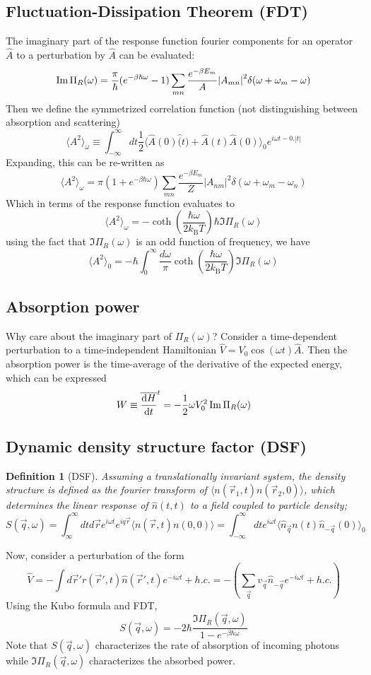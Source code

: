 \documentclass[10pt]{article}
\newcommand{\kb}{k_{\text{B}}}
\newtheorem*{defn}{Definition}
\begin{document}
\subsection{Fluctuation-Dissipation Theorem (FDT)}
The imaginary part of the response function fourier components for an operator $\hat A$ to a perturbation by $\hat A$ can be evaluated:
$$
\Im \Pi_R(\omega) = \frac{\pi}{\hbar}(e^{-\beta \hbar \omega}-1)\sum_{mn}\frac{e^{-\beta E_m}}{A}\qty|A_{mn}|^2 \delta(\omega+\omega_m-\omega)
$$
Then we define the symmetrized correlation function (not distinguishing between absorption and scattering)
$$
\langle A^2 \rangle_\omega \equiv \int_{-\infty}^\infty dt \frac{1}{2} \langle \hat A(0) \hat (t) + \hat A(t) \hat A(0) \rangle_0 e^{i\omega t - 0.|t|}
$$
Expanding, this can be re-written as
$$
\langle A^2 \rangle_{\omega} = \pi (1+e^{-\beta \hbar \omega})\sum_{mn} \frac{e^{-\beta E_m}}{Z}|A_{nm}|^2\delta(\omega + \omega_m - \omega_n)
$$
Which in terms of the response function evaluates to 
$$
\langle A^2 \rangle_\omega = -\coth(\frac{\hbar \omega}{2\kb T})\hbar \Im \Pi_R(\omega)
$$
using the fact that $\Im \Pi_R(\omega)$ is an odd function of frequency, we have
$$
\langle A^2 \rangle_{0} = -\hbar \int_0^\infty \frac{d\omega}{\pi}\coth(\frac{\hbar \omega}{2\kb T})\Im \Pi_R(\omega)
$$

\subsection{Absorption power}
Why care about the imaginary part of $\Pi_R(\omega)$? Consider a time-dependent perturbation to a time-independent Hamiltonian $\hat V = V_0 \cos(\omega t)\hat A$. Then the absorption power is the time-average of the derivative of the expected energy, which can be expressed
$$
W \equiv \overline{\dv{H}{t}}^t = -\frac{1}{2}\omega V_{0}^2 \Im \Pi_R(\omega)
$$

\subsection{Dynamic density structure factor (DSF)}
\begin{defn}[DSF]
Assuming a translationally invariant system, the density structure is defined as the fourier transform of $\langle n(\vec r_1, t) n(\vec r_2, 0) \rangle$, which determines the linear response of $\hat n(t, t)$ to a field coupled to particle density;
$$
S(\vec q, \omega) = \int_{\infty}^\infty dt d\vec r e^{i\omega t}e^{iq\vec r} \langle n(\vec r, t)n(0, 0)\rangle = \int_{-\infty}^\infty dt e^{i\omega t}\langle \hat n_{\vec q}n(t)\hat n_{-\vec q}(0)\rangle_0
$$
\end{defn}
Now, consider a perturbation of the form
$$
\hat V = -\int d\vec r' r(\vec r', t) \hat n(\vec r', t) e^{-i\omega t} + h.c. = -(\sum_{\vec q}v_{\vec q}\hat n_{-\vec q}e^{-i\omega t} + h.c.)
$$
Using the Kubo formula and FDT,
$$
S(\vec q, \omega) = -2\hbar \frac{\Im \Pi_R(\vec q, \omega)}{1-e^{-\beta \hbar \omega}}
$$
Note that $S(\vec q, \omega)$ characterizes the rate of absorption of incoming photons while $\Im \Pi_R(\vec q, \omega)$ characterizes the absorbed power.
\end{document}
